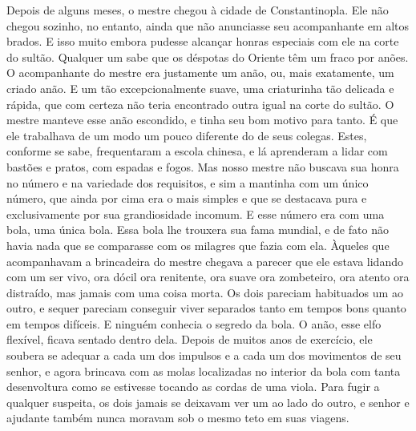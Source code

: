 Depois de alguns meses, o mestre chegou à cidade de Constantinopla. Ele
não chegou sozinho, no entanto, ainda que não anunciasse seu
acompanhante em altos brados. E isso muito embora pudesse alcançar
honras especiais com ele na corte do sultão. Qualquer um sabe que os
déspotas do Oriente têm um fraco por anões. O acompanhante do mestre era
justamente um anão, ou, mais exatamente, um criado anão. E um tão
excepcionalmente suave, uma criaturinha tão delicada e rápida, que com
certeza não teria encontrado outra igual na corte do sultão. O mestre
manteve esse anão escondido, e tinha seu bom motivo para tanto. É que
ele trabalhava de um modo um pouco diferente do de seus colegas. Estes,
conforme se sabe, frequentaram a escola chinesa, e lá aprenderam a lidar
com bastões e pratos, com espadas e fogos. Mas nosso mestre não buscava
sua honra no número e na variedade dos requisitos, e sim a mantinha com
um único número, que ainda por cima era o mais simples e que se
destacava pura e exclusivamente por sua grandiosidade incomum. E esse
número era com uma bola, uma única bola. Essa bola lhe trouxera sua fama
mundial, e de fato não havia nada que se comparasse com os milagres que
fazia com ela. Àqueles que acompanhavam a brincadeira do mestre chegava
a parecer que ele estava lidando com um ser vivo, ora dócil ora
renitente, ora suave ora zombeteiro, ora atento ora distraído, mas
jamais com uma coisa morta. Os dois pareciam habituados um ao outro, e
sequer pareciam conseguir viver separados tanto em tempos bons quanto em
tempos difíceis. E ninguém conhecia o segredo da bola. O anão, esse elfo
flexível, ficava sentado dentro dela. Depois de muitos anos de
exercício, ele soubera se adequar a cada um dos impulsos e a cada um dos
movimentos de seu senhor, e agora brincava com as molas localizadas no
interior da bola com tanta desenvoltura como se estivesse tocando as
cordas de uma viola. Para fugir a qualquer suspeita, os dois jamais se
deixavam ver um ao lado do outro, e senhor e ajudante também nunca
moravam sob o mesmo teto em suas viagens.

